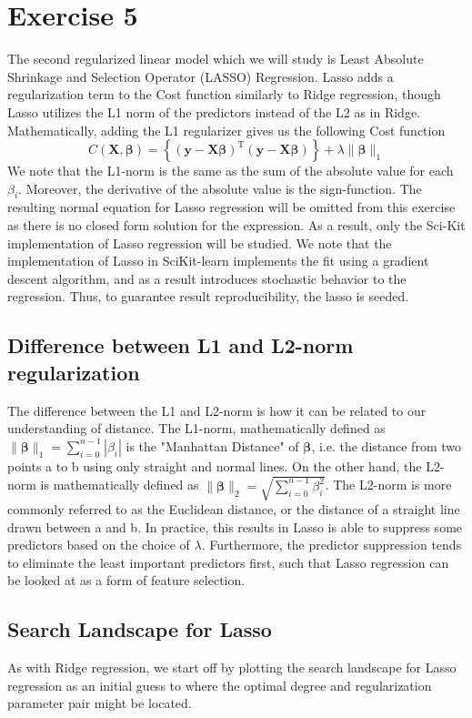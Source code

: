 \documentclass[11pt, a4paper]{article}
\begin{document}
\section*{Exercise 5}
The second regularized linear model which we will study is Least Absolute Shrinkage and Selection Operator (LASSO) Regression. Lasso adds a regularization term to the Cost function similarly to Ridge regression, though Lasso utilizes the L1 norm of the predictors instead of the L2 as in Ridge. \cite{Geron2019} Mathematically, adding the L1 regularizer gives us the following Cost function
\[
  C\left(\bm{X},\bm{\beta}\right) = \left\{\left(\bm{y}-\bm{X}\bm{\beta}\right)^\text{T}\left(\bm{y}-\bm{X}\bm{\beta}\right)\right\}+\lambda\lVert \bm{\beta}\rVert_1
\]
We note that the L1-norm is the same as the sum of the absolute value for each $\beta_i$. Moreover, the derivative of the absolute value is the sign-function. The resulting normal equation for Lasso regression will be omitted from this exercise as there is no closed form solution for the expression. \cite{Hastie2009} As a result, only the Sci-Kit implementation of Lasso regression will be studied. We note that the implementation of Lasso in SciKit-learn implements the fit using a gradient descent algorithm, and as a result introduces stochastic behavior to the regression. \cite{scikit-learn} Thus, to guarantee result reproducibility, the lasso is seeded.

\subsection*{Difference between L1 and L2-norm regularization}
The difference between the L1 and L2-norm is how it can be related to our understanding of distance. The L1-norm, mathematically defined as $\lVert \bm{\beta} \rVert_1 = \sum_{i=0}^{n-1}|\beta_i|$ is the "Manhattan Distance" of $\bm{\beta}$, i.e. the distance from two points a to b using only straight and normal lines. On the other hand, the L2-norm is mathematically defined as $\lVert \bm{\beta} \rVert_2 = \sqrt{\sum_{i=0}^{n-1}\beta_i^2}$. The L2-norm is more commonly referred to as the Euclidean distance, or the distance of a straight line drawn between a and b. In practice, this results in Lasso is able to suppress some predictors based on the choice of $\lambda$. Furthermore, the predictor suppression tends to eliminate the least important predictors first, such that Lasso regression can be looked at as a form of feature selection. \cite{Geron2019}

\subsection*{Search Landscape for Lasso}
As with Ridge regression, we start off by plotting the search landscape for Lasso regression as an initial guess to where the optimal degree and regularization parameter pair might be located. 
\end{document}
